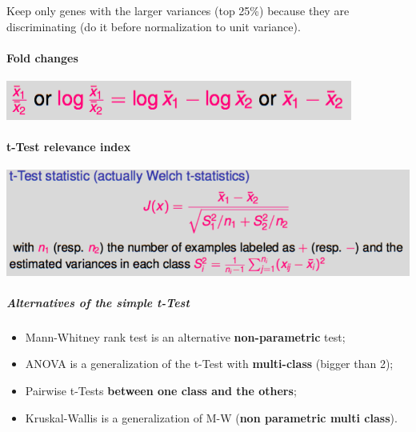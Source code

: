 Keep only genes with the larger variances (top 25\%) because they are discriminating (do it before normalization to unit variance).


\paragraph{Fold changes}

\begin{center}
	\includegraphics[scale=0.6]{images/60_fold.png}
\end{center}

\paragraph{t-Test relevance index}

\begin{center}
	\includegraphics[scale=0.6]{images/61_test.png}
\end{center}

\subparagraph{Alternatives of the simple t-Test}
\begin{itemize}
	\item Mann-Whitney rank test is an alternative \textbf{non-parametric} test;
	\item ANOVA is a generalization of the t-Test with \textbf{multi-class} (bigger than 2);
	\item Pairwise t-Tests \textbf{between one class and the others};
	\item Kruskal-Wallis is a generalization of M-W (\textbf{non parametric multi class}).
\end{itemize}

